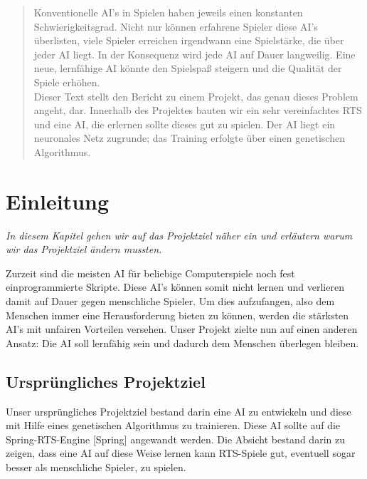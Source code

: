 \documentclass[
	12pt,
	a4paper,
	BCOR10mm,
	DIV14,
	headsepline,
	usegeometry,
]{scrreprt}
\begin{document}
\restoregeometry


\tableofcontents

\begin{abstract}
Konventionelle AI's in Spielen haben jeweils einen konstanten Schwierigkeitsgrad. Nicht nur können erfahrene Spieler diese AI's überlisten, viele Spieler erreichen irgendwann eine Spielstärke, die über jeder AI liegt. In der Konsequenz wird jede AI auf Dauer langweilig. Eine neue, lernfähige AI könnte den Spielspaß steigern und die Qualität der Spiele erhöhen.\\
Dieser Text stellt den Bericht zu einem Projekt, das genau dieses Problem angeht, dar. 
Innerhalb des Projektes bauten wir ein sehr vereinfachtes RTS und eine AI, die erlernen sollte dieses gut zu spielen. 
Der AI liegt ein neuronales Netz zugrunde; das Training erfolgte über einen genetischen Algorithmus.
\end{abstract}


\chapter{Einleitung}
\label{Einleitung}

\textit{%
In diesem Kapitel gehen wir auf das Projektziel näher ein und erläutern warum wir das Projektziel ändern mussten.
}

\bigskip

Zurzeit sind die meisten AI für beliebige Computerspiele noch fest einprogrammierte Skripte. Diese AI's können somit nicht lernen und verlieren damit auf Dauer gegen menschliche Spieler. Um dies aufzufangen, also dem Menschen immer eine Herausforderung bieten zu können, werden die stärksten AI's mit unfairen Vorteilen versehen. Unser Projekt zielte nun auf einen anderen Ansatz: Die AI soll lernfähig sein und dadurch dem Menschen überlegen bleiben.

\section{Ursprüngliches Projektziel}

Unser ursprüngliches Projektziel bestand darin eine AI zu entwickeln und diese mit Hilfe eines genetischen Algorithmus zu trainieren. Diese AI sollte auf die Spring-RTS-Engine [Spring] angewandt werden. Die Absicht bestand darin zu zeigen, dass eine AI auf diese Weise lernen kann RTS-Spiele gut, eventuell sogar besser als menschliche Spieler, zu spielen.\\
\end{document}
